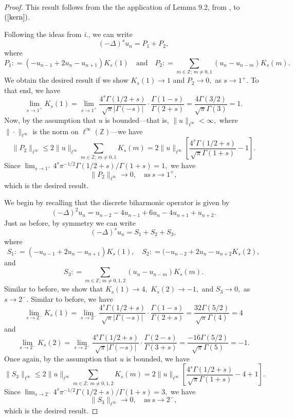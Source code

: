 \documentclass[final,1p,times]{elsarticle}
\def\ZZ{\mathbb Z} %
\def\l{\left}
\def\r{\right}
\newcommand{\bb}[1]{\begin{equation}\label{#1}}
\newcommand{\ee}{\end{equation}}
\newcommand{\no}{\noindent}
\def\R#1{$(\ref{#1})$}
\theoremstyle{remark}
\theoremstyle{definition}
\begin{document}
\begin{proof}
\vspace{3mm}

\no{\em ii.} This result follows from the the application of Lemma 9.2, from \cite{ciaurri2016nonlocal}, to \R{kern}.

\vspace{3mm}

\no{\em iii.} Following the ideas from {\em i.}, we can write
$$(-\Delta)^s u_n = P_1 + P_2,$$
where
$$P_1\mathrel{\mathop:}= (-u_{n-1}+2u_n-u_{n+1})K_s(1)\quad\mbox{and}\quad P_2\mathrel{\mathop:}= \sum_{m\in\ZZ;\,m\neq 0,1} (u_n - u_{n-m})K_s(m).$$
We obtain the desired result if we show $K_s(1) \to 1$ and $P_2 \to 0,$ as $s\to 1^+.$ To that end, we have
$$\lim_{s\to 1^+} K_s(1) = \lim_{s\to 1^+} \frac{4^s\Gamma(1/2+s)}{\sqrt{\pi}|\Gamma(-s)|}\cdot\frac{\Gamma(1-s)}{\Gamma(2+s)} = \frac{4\Gamma(3/2)}{\sqrt{\pi}\Gamma(3)} = 1.$$
Now, by the assumption that $u$ is bounded---that is, $\|u\|_{\ell^\infty} < \infty,$ where $\|\cdot\|_{\ell^\infty}$ is the norm  on $\ell^\infty(\ZZ)$---we have
$$\|P_2\|_{\ell^\infty} \le 2\|u\|_{\ell^\infty}\sum_{m\in\ZZ;\,m\neq 0,1} K_s(m) = 2\|u\|_{\ell^\infty}\l[\frac{4^s\Gamma(1/2+s)}{\sqrt{\pi}\Gamma(1+s)} - 1\r].$$
Since $\textstyle\lim_{s\to 1^+} 4^s\pi^{-1/2}\Gamma(1/2+s)/\Gamma(1+s) = 1,$ we have 
$$\|P_2\|_{\ell^\infty} \to 0, \quad \mbox{as}\ s\to 1^+,$$
which is the desired result.

\vspace{3mm}

\no{\em iv.} We begin by recalling that the discrete biharmonic operator is given by
\bb{biharm}
(-\Delta)^2u_n = u_{n-2} - 4u_{n-1} + 6u_n - 4u_{n+1} + u_{n+2}.
\ee
Just as before, by symmetry we can write
$$(-\Delta)^su_n = S_1 + S_2 + S_3,$$
where
$$S_1 \mathrel{\mathop:}= (-u_{n-1}+2u_n-u_{n+1})K_s(1),\quad S_2 \mathrel{\mathop:}= (-u_{n-2} + 2u_n - u_{n+2}K_s(2),$$
and
$$S_3 \mathrel{\mathop:}= \sum_{m\in\ZZ;\,m\neq 0,1,2} (u_n - u_{n-m})K_s(m).$$
Similar to before, we show that $K_s(1) \to 4,$ $K_s(2) \to -1,$ and $S_3 \to 0,$ as $s\to 2^-.$ Similar to before, we have
$$\lim_{s\to 2^-}K_s(1) = \lim_{s\to 2^-}\frac{4^s\Gamma(1/2+s)}{\sqrt{\pi}|\Gamma(-s)|}\cdot\frac{\Gamma(1-s)}{\Gamma(2+s)} = \frac{32\Gamma(5/2)}{\sqrt{\pi}\Gamma(4)} = 4$$
and
$$\lim_{s\to 2^-}K_s(2) = \lim_{s\to 2^-}\frac{4^s\Gamma(1/2+s)}{\sqrt{\pi}|\Gamma(-s)|}\cdot\frac{\Gamma(2-s)}{\Gamma(3+s)} = \frac{-16\Gamma(5/2)}{\sqrt{\pi}\Gamma(5)} = -1.$$
Once again, by the assumption that $u$ is bounded, we have
$$\|S_3\|_{\ell^\infty} \le 2\|u\|_{\ell^\infty} \sum_{m\in\ZZ;\,m\neq 0,1,2}K_s(m) = 2\|u\|_{\ell^\infty}\l[\frac{4^s\Gamma(1/2+s)}{\sqrt{\pi}\Gamma(1+s)} - 4 + 1\r].$$
Since $\textstyle\lim_{s\to 2^-} 4^s\pi^{-1/2}\Gamma(1/2+s)/\Gamma(1+s) = 3,$ we have 
$$\|S_3\|_{\ell^\infty} \to 0, \quad \mbox{as}\ s\to 2^-,$$
which is the desired result.
\end{proof}
\end{document}
